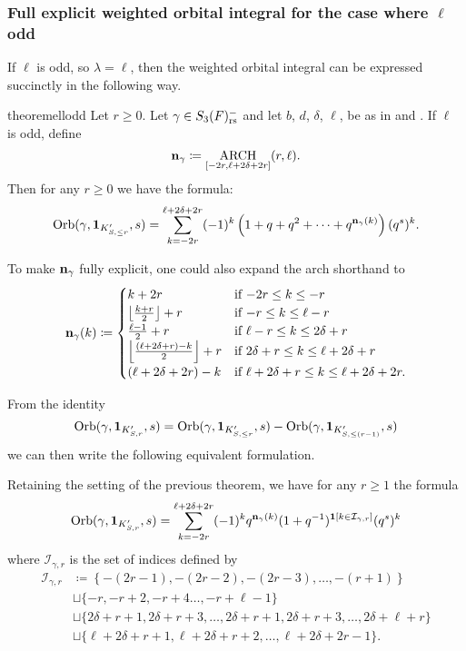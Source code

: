 \subsubsection{Full explicit weighted orbital integral for the case where $\ell$ odd}
If $\ell$ is odd, so $\lambda = \ell$, then
the weighted orbital integral can be expressed succinctly in the following way.
\begin{restatable}{theorem}{ellodd}
  \label{thm:full_orbital_ell_odd}
  Let $r \ge 0$.
  Let $\gamma \in S_3(F)_{\mathrm{rs}}^-$ and let $b$, $d$, $\delta$, $\ell$, be as in
   and .
  If $\ell$ is odd, define
  \[ \mathbf n_\gamma \coloneqq \operatorname*{ARCH}_{[-2r, \ell + 2\delta + 2r]}(r, \ell). \]
  Then for any $r \ge 0$ we have the formula:
  \[
    \operatorname{Orb}(\gamma, \mathbf{1}_{K'_{S, \le r}}, s)
    = \sum_{k = -2r}^{\ell + 2\delta + 2r}
    (-1)^k \left( 1 + q + q^2 + \dots + q^{\mathbf n_{\gamma}(k)} \right) (q^s)^k.
  \]
\end{restatable}
\begin{remark}
  To make $\mathbf n_\gamma$ fully explicit, one could also expand the arch shorthand to
  \[
    \mathbf n_\gamma(k)
    \coloneqq \begin{cases}
      k + 2r & \text{if } {-2r} \le k \le -r \\
      \left\lfloor \frac{k+r}{2} \right\rfloor + r & \text{if }{-r} \le k \le \ell-r \\
      \frac{\ell-1}{2} + r & \text{if } \ell - r \le k \le 2\delta + r \\
      \left\lfloor \frac{(\ell+2\delta+r)-k}{2} \right\rfloor + r & \text{if } 2\delta + r \le k \le \ell + 2\delta + r\\
      (\ell + 2\delta + 2r) - k & \text{if } \ell + 2\delta + r \le k \le \ell + 2\delta + 2r.
    \end{cases} \]
\end{remark}

From the identity
\[
  \operatorname{Orb}(\gamma, \mathbf{1}_{K'_{S, r}}, s)
  = \operatorname{Orb}(\gamma, \mathbf{1}_{K'_{S, \le r}}, s)
  - \operatorname{Orb}(\gamma, \mathbf{1}_{K'_{S, \le (r-1)}}, s)
\]
we can then write the following equivalent formulation.
\begin{corollary}
  Retaining the setting of the previous theorem, we have for any $r \ge 1$ the formula
  \[
    \operatorname{Orb}(\gamma, \mathbf{1}_{K'_{S, r}}, s)
    = \sum_{k = -2r}^{\ell + 2\delta + 2r}
    (-1)^k q^{\mathbf n_{\gamma}(k)}
    (1+q^{-1})^{\mathbf{1}[k \in \mathcal I_{\gamma, r}]}
    (q^s)^k
  \]
  where $\mathcal I_{\gamma, r}$ is the set of indices defined by
  \begin{align*}
    \mathcal{I}_{\gamma, r}
    &\coloneqq \left\{ -(2r-1), -(2r-2), -(2r-3), \dots, -(r+1) \right\} \\
    &\sqcup \{-r, -r+2, -r+4 \dots, -r+\ell-1 \} \\
    &\sqcup \{ 2\delta+r+1, 2\delta+r+3, \dots, 2\delta+r+1, 2\delta+r+3, \dots, 2\delta+\ell+r \} \\
    &\sqcup \{ \ell+2\delta+r+1, \ell+2\delta+r+2, \dots, \ell+2\delta+2r-1 \}.
  \end{align*}
\end{corollary}

